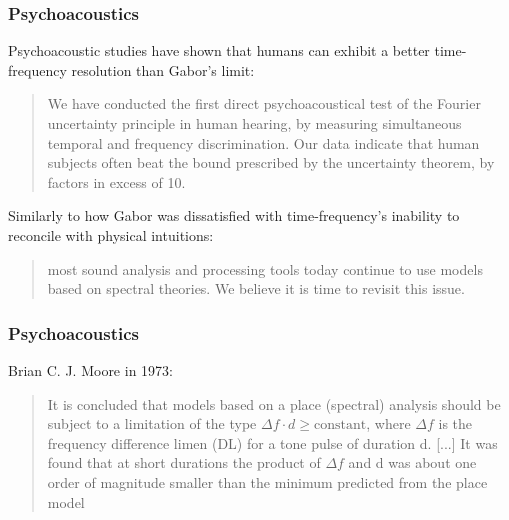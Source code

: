 \documentclass{beamer}
\begin{document}
\begin{frame}
	\frametitle{Psychoacoustics}
	Psychoacoustic studies have shown that humans can exhibit a better time-frequency resolution than Gabor's limit:
	\begin{quote}
		We have conducted the first direct psychoacoustical test of the Fourier uncertainty principle in human hearing, by measuring simultaneous temporal and frequency discrimination. Our data indicate that human subjects often beat the bound prescribed by the uncertainty theorem, by factors in excess of 10.
	\end{quote}
	Similarly to how Gabor was dissatisfied with time-frequency's inability to reconcile with physical intuitions:
	\begin{quote}
		most sound analysis and processing tools today continue to use models based on spectral theories. We believe it is time to revisit this issue.
	\end{quote}
\end{frame}


\begin{frame}
	\frametitle{Psychoacoustics}
	Brian C. J. Moore in 1973:
	\begin{quote}
		It is concluded that models based on a place (spectral) analysis should be subject to a limitation of the type $\Delta f \cdot d \ge \text{constant}$, where $\Delta f$ is the frequency difference limen (DL) for a tone pulse of duration d. [...]  It was found that at short durations the product of $\Delta f$ and d was about one order of magnitude smaller than the minimum predicted from the place model
	\end{quote}
\end{frame}

\end{document}
